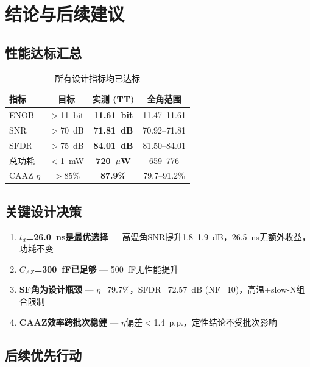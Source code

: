 \documentclass[11pt,a4paper,UTF8]{ctexart}
\newcommand{\keydata}[1]{\textbf{\color{primaryblue}#1}}
\begin{document}
\section{结论与后续建议}
\label{sec:conclusion}

\subsection{性能达标汇总}

\begin{table}[htbp]
\centering
\caption{所有设计指标均已达标}
\label{tab:final}
\begin{tabular}{lccc}
\toprule
\textbf{指标} & \textbf{目标} & \textbf{实测 (TT)} & \textbf{全角范围} \\
\midrule
ENOB & $>$11~bit & \keydata{11.61~bit} & 11.47--11.61 \\
SNR & $>$70~dB & \keydata{71.81~dB} & 70.92--71.81 \\
SFDR & $>$75~dB & \keydata{84.01~dB} & 81.50--84.01 \\
总功耗 & $<$1~mW & \keydata{720~$\mu$W} & 659--776 \\
CAAZ $\eta$ & $>$85\% & \keydata{87.9\%} & 79.7--91.2\% \\
\bottomrule
\end{tabular}
\end{table}

\subsection{关键设计决策}

\begin{enumerate}
  \item \textbf{$t_d$=26.0~ns是最优选择} --- 高温角SNR提升1.8--1.9~dB，26.5~ns无额外收益，功耗不变
  \item \textbf{$C_{AZ}$=300~fF已足够} --- 500~fF无性能提升
  \item \textbf{SF角为设计瓶颈} --- $\eta$=79.7\%，SFDR=72.57~dB (NF=10)，高温+slow-N组合限制
  \item \textbf{CAAZ效率跨批次稳健} --- $\eta$偏差$<$1.4~p.p.，定性结论不受批次影响
\end{enumerate}

\subsection{后续优先行动}
\end{document}
